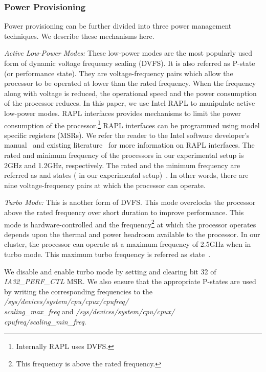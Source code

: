 \documentclass{sig-alternate}
\begin{document}
\subsubsection{Power Provisioning}
\label{sec:bkgndpprov}
Power provisioning can be further divided into three power management 
techniques. We describe these mechanisms here. 

\emph{Active Low-Power Modes:} These low-power modes are the most popularly used 
form of dynamic voltage frequency scaling (DVFS). It is also referred as P-state 
(or performance state). They are voltage-frequency 
pairs which allow the processor to be operated at lower than the rated 
frequency. When the frequency along with voltage is reduced, the operational 
speed and the power consumption of the processor reduces. In this paper, 
we use Intel RAPL to manipulate active low-power modes. RAPL interfaces 
provides mechanisms to limit the power consumption of the processor.\footnote{Internally 
RAPL uses DVFS.} RAPL interfaces can be programmed using model specific registers 
(MSRs). We refer the reader to the Intel software developer's manual~\cite{intelsdm} 
and existing literature~\cite{barrypowerlimit, icpe_eprop} for more information on 
RAPL interfaces. The rated and minimum frequency of the processors in our experimental setup is 
2GHz and 1.2GHz, respectively. The rated and the minimum frequency are referred as 
 and  states ( in our experimental setup)~\cite{snbpower}. In other words, 
there are nine voltage-frequency pairs at which the processor can operate. 

\emph{Turbo Mode:} This is another form of DVFS. This mode overclocks the 
processor above the rated frequency over short duration to improve 
performance. This mode is hardware-controlled and the frequency\footnote{This frequency is above the 
rated frequency.} at which the processor operates depends upon the thermal and power headroom 
available to the processor. In our cluster, the processor can operate at a maximum frequency of 2.5GHz 
when in turbo mode. This maximum turbo frequency is referred as  state~\cite{snbpower}. 

We disable and enable turbo mode by setting and clearing bit 32 of \emph{IA32\_PERF\_CTL} MSR. 
We also ensure that the appropriate P-states are used by writing the corresponding 
frequencies to the \emph{/sys/devices/system/cpu/cpux/cpufreq/\\scaling\_max\_freq} 
and \emph{/sys/devices/system/cpu/cpux/\\cpufreq/scaling\_min\_freq}. 
\end{document}
